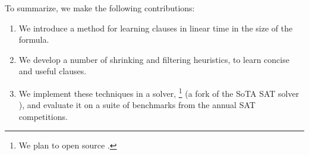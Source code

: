 
To summarize, we make the following contributions: 

\begin{enumerate} 
    \item We introduce a method for learning \pr clauses in linear time in the
    size of the formula. 
    \item We develop a number of shrinking and filtering heuristics, to learn
    concise and useful \pr clauses.%
    \item We implement these techniques in a solver, \tool\footnote{We plan to
    open source \tool.} (a fork of the SoTA SAT solver \cadical), and evaluate
    it on a suite of benchmarks from the annual SAT competitions.
\end{enumerate}